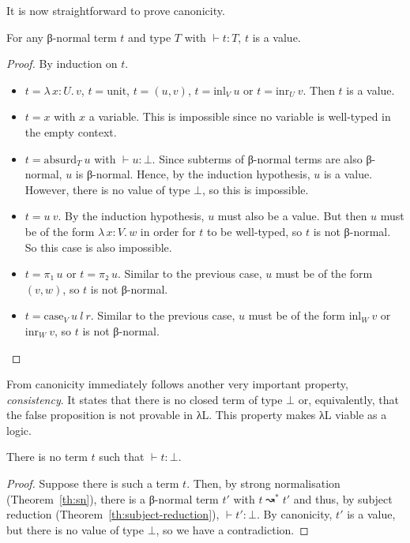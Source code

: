 \documentclass{scrartcl}
\theoremstyle{definition}
\newcommand{\Lam}[2]{λ\,#1.\, #2}
\newcommand{\unit}{\mathrm{unit}}
\newcommand{\absurd}{\mathrm{absurd}}
\newcommand{\inl}{\ensuremath{\mathrm{inl}}}
\newcommand{\inr}{\ensuremath{\mathrm{inr}}}
\newcommand{\case}{\mathrm{case}}
\begin{document}
It is now straightforward to prove canonicity.

\begin{theorem}[Canonicity]
  For any β-normal term $t$ and type $T$ with $⊢ t : T$, $t$ is a value.
\end{theorem}

\begin{proof}
  By induction on $t$.
  \begin{itemize}
    \item $t = \Lam{x : U}{v}$, $t = \unit$, $t = (u, v)$, $t = \inl_{V}~u$ or $t = \inr_{U}~v$.
          Then $t$ is a value.
    \item $t = x$ with $x$ a variable.
          This is impossible since no variable is well-typed in the empty context.
    \item $t = \absurd_{T}~u$ with $⊢ u : ⊥$.
          Since subterms of β-normal terms are also β-normal, $u$ is β-normal.
          Hence, by the induction hypothesis, $u$ is a value.
          However, there is no value of type $⊥$, so this is impossible.
    \item $t = u~v$.
          By the induction hypothesis, $u$ must also be a value.
          But then $u$ must be of the form $\Lam{x : V}{w}$ in order for $t$ to be well-typed, so $t$ is not β-normal.
          So this case is also impossible.
    \item $t = π₁~u$ or $t = π₂~u$.
          Similar to the previous case, $u$ must be of the form $(v, w)$, so $t$ is not β-normal.
    \item $t = \case_{V}~u~l~r$.
          Similar to the previous case, $u$ must be of the form $\inl_{W}~v$ or $\inr_{W}~v$, so $t$ is not β-normal.
  \end{itemize}
\end{proof}

From canonicity immediately follows another very important property, \emph{consistency}.
It states that there is no closed term of type $⊥$ or, equivalently, that the false proposition is not provable in λL.
This property makes λL viable as a logic.

\begin{theorem}[Consistency]\label{th:consistency}
  There is no term $t$ such that $⊢ t : ⊥$.
\end{theorem}

\begin{proof}
  Suppose there is such a term $t$.
  Then, by strong normalisation (Theorem~\ref{th:sn}), there is a β-normal term $t'$ with $t ↝^{*} t'$ and thus, by subject reduction (Theorem~\ref{th:subject-reduction}), $⊢ t' : ⊥$.
  By canonicity, $t'$ is a value, but there is no value of type $⊥$, so we have a contradiction.
\end{proof}
\end{document}
